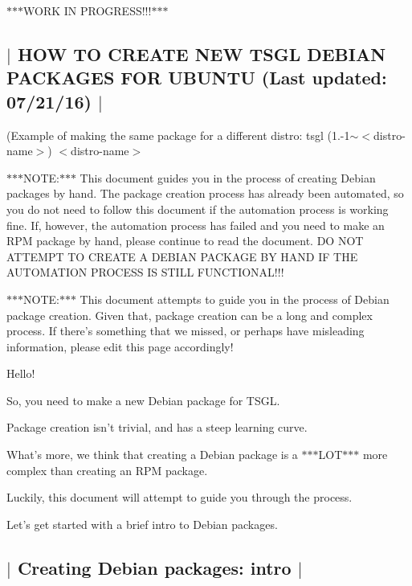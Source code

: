 $\ast$$\ast$$\ast$\-W\-O\-R\-K I\-N P\-R\-O\-G\-R\-E\-S\-S!!!$\ast$$\ast$$\ast$ 

 \subsection*{$\vert$ H\-O\-W T\-O C\-R\-E\-A\-T\-E N\-E\-W T\-S\-G\-L D\-E\-B\-I\-A\-N P\-A\-C\-K\-A\-G\-E\-S F\-O\-R U\-B\-U\-N\-T\-U (Last updated\-: 07/21/16) $\vert$ }

(Example of making the same package for a different distro\-: tsgl (1.-\/1$\sim$$<$distro-\/name$>$) $<$distro-\/name$>$

$\ast$$\ast$$\ast$\-N\-O\-T\-E\-:$\ast$$\ast$$\ast$ This document guides you in the process of creating Debian packages by hand. The package creation process has already been automated, so you do not need to follow this document if the automation process is working fine. If, however, the automation process has failed and you need to make an R\-P\-M package by hand, please continue to read the document. D\-O N\-O\-T A\-T\-T\-E\-M\-P\-T T\-O C\-R\-E\-A\-T\-E A D\-E\-B\-I\-A\-N P\-A\-C\-K\-A\-G\-E B\-Y H\-A\-N\-D I\-F T\-H\-E A\-U\-T\-O\-M\-A\-T\-I\-O\-N P\-R\-O\-C\-E\-S\-S I\-S S\-T\-I\-L\-L F\-U\-N\-C\-T\-I\-O\-N\-A\-L!!!

$\ast$$\ast$$\ast$\-N\-O\-T\-E\-:$\ast$$\ast$$\ast$ This document attempts to guide you in the process of Debian package creation. Given that, package creation can be a long and complex process. If there's something that we missed, or perhaps have misleading information, please edit this page accordingly!

Hello!

So, you need to make a new Debian package for T\-S\-G\-L.

Package creation isn't trivial, and has a steep learning curve.

What's more, we think that creating a Debian package is a $\ast$$\ast$$\ast$\-L\-O\-T$\ast$$\ast$$\ast$ more complex than creating an R\-P\-M package.

Luckily, this document will attempt to guide you through the process.

Let's get started with a brief intro to Debian packages. 

 \subsection*{$\vert$ Creating Debian packages\-: intro $\vert$ }


